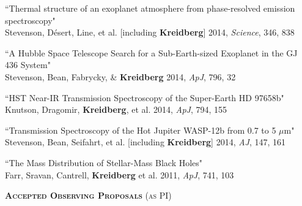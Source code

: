 \documentclass[12pt,letterpaper]{article}
\begin{document}
\begin{compactenum}
\item ``Thermal structure of an exoplanet atmosphere from phase-resolved emission spectroscopy"\\
Stevenson, D\'esert, Line, et al. [including \textbf{Kreidberg}] 2014, \textit{Science}, 346, 838

\item ``A Hubble Space Telescope Search for a Sub-Earth-sized Exoplanet in the GJ 436 System"\\
Stevenson, Bean, Fabrycky, \& \textbf{Kreidberg} 2014, \textit{ApJ}, 796, 32

\item ``HST Near-IR Transmission Spectroscopy of the Super-Earth HD 97658b"\\
Knutson, Dragomir, \textbf{Kreidberg}, et al. 2014, \textit{ApJ}, 794, 155

\item ``Transmission Spectroscopy of the Hot Jupiter WASP-12b from 0.7 to 5 $\mu$m"\\
Stevenson, Bean, Seifahrt, et al. [including \textbf{Kreidberg}] 2014, \textit{AJ}, 147, 161

\item ``The Mass Distribution of Stellar-Mass Black Holes"\\
Farr, Sravan, Cantrell, \textbf{Kreidberg} et al. 2011, \textit{ApJ}, 741, 103
\end{compactenum}

\vspace{5mm}
\textbf{\textsc{Accepted Observing Proposals}} \textsc{(as PI)}
\vspace{1mm}
\end{document}
